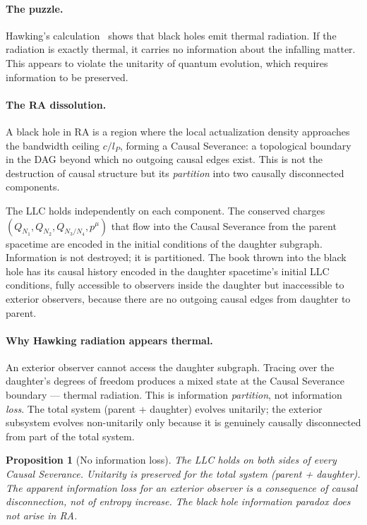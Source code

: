 \documentclass[11pt,a4paper]{article}
\newtheorem{proposition}[theorem]{Proposition}
\begin{document}
\paragraph{The puzzle.}
Hawking's calculation~\citep{Hawking1975} shows that black holes emit
thermal radiation. If the radiation is exactly thermal, it carries no
information about the infalling matter. This appears to violate the
unitarity of quantum evolution, which requires information to be
preserved.

\paragraph{The RA dissolution.}
A black hole in RA is a region where the local actualization density
approaches the bandwidth ceiling $c/l_P$, forming a Causal Severance:
a topological boundary in the DAG beyond which no outgoing causal edges
exist. This is not the destruction of causal structure but its
\emph{partition} into two causally disconnected components.

The LLC holds independently on each component. The conserved charges
$(Q_{N_1}, Q_{N_2}, Q_{N_3/N_4}, p^\mu)$ that flow into the Causal
Severance from the parent spacetime are encoded in the initial
conditions of the daughter subgraph. Information is not destroyed;
it is partitioned. The book thrown into the black hole has its causal
history encoded in the daughter spacetime's initial LLC conditions,
fully accessible to observers inside the daughter but inaccessible to
exterior observers, because there are no outgoing causal edges from
daughter to parent.

\paragraph{Why Hawking radiation appears thermal.}
An exterior observer cannot access the daughter subgraph. Tracing over
the daughter's degrees of freedom produces a mixed state at the
Causal Severance boundary --- thermal radiation. This is information
\emph{partition}, not information \emph{loss}. The total system
(parent + daughter) evolves unitarily; the exterior subsystem evolves
non-unitarily only because it is genuinely causally disconnected from
part of the total system.

\begin{proposition}[No information loss]
\label{prop:bh_info}
The LLC holds on both sides of every Causal Severance. Unitarity
is preserved for the total system (parent + daughter). The apparent
information loss for an exterior observer is a consequence of causal
disconnection, not of entropy increase. The black hole information
paradox does not arise in RA.
\end{proposition}
\end{document}
